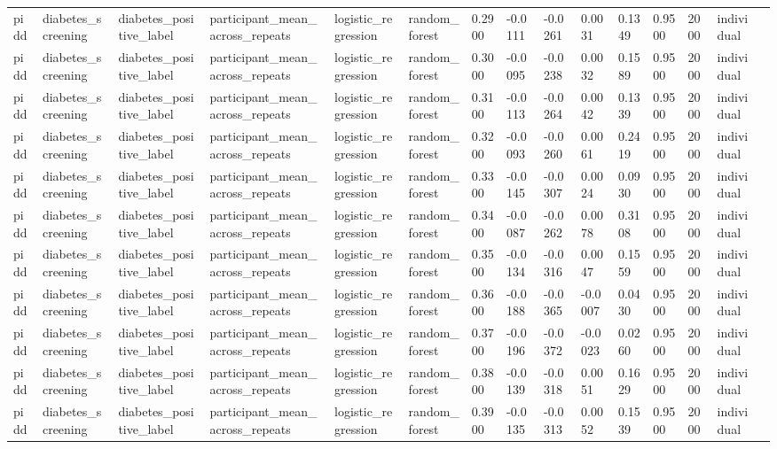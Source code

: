 \begin{tabular}{lllllllllllllll}
pidd & diabetes\_screening & diabetes\_positive\_label & participant\_mean\_across\_repeats & logistic\_regression & random\_forest & 0.2900 & -0.0111 & -0.0261 & 0.0031 & 0.1349 & 0.9500 & 2000 & individual &  \\
pidd & diabetes\_screening & diabetes\_positive\_label & participant\_mean\_across\_repeats & logistic\_regression & random\_forest & 0.3000 & -0.0095 & -0.0238 & 0.0032 & 0.1589 & 0.9500 & 2000 & individual &  \\
pidd & diabetes\_screening & diabetes\_positive\_label & participant\_mean\_across\_repeats & logistic\_regression & random\_forest & 0.3100 & -0.0113 & -0.0264 & 0.0042 & 0.1339 & 0.9500 & 2000 & individual &  \\
pidd & diabetes\_screening & diabetes\_positive\_label & participant\_mean\_across\_repeats & logistic\_regression & random\_forest & 0.3200 & -0.0093 & -0.0260 & 0.0061 & 0.2419 & 0.9500 & 2000 & individual &  \\
pidd & diabetes\_screening & diabetes\_positive\_label & participant\_mean\_across\_repeats & logistic\_regression & random\_forest & 0.3300 & -0.0145 & -0.0307 & 0.0024 & 0.0930 & 0.9500 & 2000 & individual &  \\
pidd & diabetes\_screening & diabetes\_positive\_label & participant\_mean\_across\_repeats & logistic\_regression & random\_forest & 0.3400 & -0.0087 & -0.0262 & 0.0078 & 0.3108 & 0.9500 & 2000 & individual &  \\
pidd & diabetes\_screening & diabetes\_positive\_label & participant\_mean\_across\_repeats & logistic\_regression & random\_forest & 0.3500 & -0.0134 & -0.0316 & 0.0047 & 0.1559 & 0.9500 & 2000 & individual &  \\
pidd & diabetes\_screening & diabetes\_positive\_label & participant\_mean\_across\_repeats & logistic\_regression & random\_forest & 0.3600 & -0.0188 & -0.0365 & -0.0007 & 0.0430 & 0.9500 & 2000 & individual &  \\
pidd & diabetes\_screening & diabetes\_positive\_label & participant\_mean\_across\_repeats & logistic\_regression & random\_forest & 0.3700 & -0.0196 & -0.0372 & -0.0023 & 0.0260 & 0.9500 & 2000 & individual &  \\
pidd & diabetes\_screening & diabetes\_positive\_label & participant\_mean\_across\_repeats & logistic\_regression & random\_forest & 0.3800 & -0.0139 & -0.0318 & 0.0051 & 0.1629 & 0.9500 & 2000 & individual &  \\
pidd & diabetes\_screening & diabetes\_positive\_label & participant\_mean\_across\_repeats & logistic\_regression & random\_forest & 0.3900 & -0.0135 & -0.0313 & 0.0052 & 0.1539 & 0.9500 & 2000 & individual &  \\

\end{tabular}
